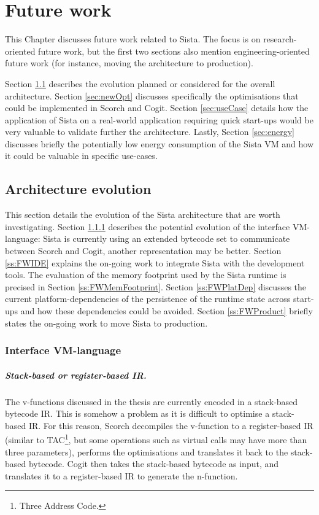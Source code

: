 \documentclass[a4paper,12pt,twoside]{../includes/ThesisStyle}
\begin{document}
\fi

\chapter{Future work}
\label{chap:futureWork}
\minitoc

This Chapter discusses future work related to Sista. The focus is on research-oriented future work, but the first two sections also mention engineering-oriented future work (for instance, moving the architecture to production).

Section \ref{sec:archEvo} describes the evolution planned or considered for the overall architecture. Section \ref{sec:newOpt} discusses specifically the optimisations that could be implemented in Scorch and Cogit. Section \ref{sec:useCase} details how the application of Sista on a real-world application requiring quick start-ups would be very valuable to validate further the architecture. Lastly, Section \ref{sec:energy} discusses briefly the potentially low energy consumption of the Sista VM and how it could be valuable in specific use-cases.

\section{Architecture evolution}
\label{sec:archEvo}

This section details the evolution of the Sista architecture that are worth investigating. Section \ref{ss:FWInterface} describes the potential evolution of the interface VM-language: Sista is currently using an extended bytecode set to communicate between Scorch and Cogit, another representation may be better. Section \ref{ss:FWIDE} explains the on-going work to integrate Sista with the development tools. The evaluation of the memory footprint used by the Sista runtime is precised in Section \ref{ss:FWMemFootprint}. Section \ref{ss:FWPlatDep} discusses the current platform-dependencies of the persistence of the runtime state across start-ups and how these dependencies could be avoided. Section \ref{ss:FWProduct} briefly states the on-going work to move Sista to production.

\subsection{Interface VM-language}
\label{ss:FWInterface}

\paragraph{Stack-based or register-based IR.}The v-functions discussed in the thesis are currently encoded in a stack-based bytecode IR. This is somehow a problem as it is difficult to optimise a stack-based IR. For this reason, Scorch decompiles the v-function to a register-based IR (similar to TAC\footnote{Three Address Code.}, but some operations such as virtual calls may have more than three parameters), performs the optimisations and translates it back to the stack-based bytecode. Cogit then takes the stack-based bytecode as input, and translates it to a register-based IR to generate the n-function. 
\end{document}

